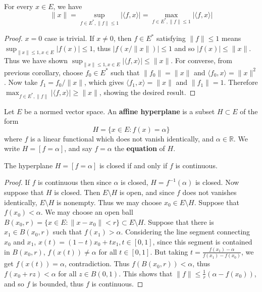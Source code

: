 \begin{cor} For every $x\in E$, we have
\begin{equation}
\|x\|=\sup_{f\in E^*,\|f\|\leq 1}|\langle f,x\rangle|=\max_{f\in E^*,\|f\|\leq 1}|\langle f,x\rangle|
\end{equation}
\end{cor}
\begin{proof}
$x=0$ case is trivial. If $x\neq 0$, then $f\in E^*$ satisfying $\|f\|\leq 1$ means $\sup_{\|x\|\leq 1,x\in E}|f(x)|\leq 1$, thus $|f(x/\|x\|)|\leq 1$ and so $|f(x)|\leq \|x\|$. Thus we have shown $\sup_{\|x\|\leq 1,x\in E}|\langle f,x\rangle|\leq \|x\|$. For converse, from previous corollary, choose $f_0\in E^*$ such that $\|f_0\|=\|x\|$ and $\langle f_0,x\rangle=\|x\|^2$. Now take $f_1=f_0/\|x\|$, which gives $\langle f_1,x\rangle = \|x\|$ and $\| f_1\|=1$. Therefore $\max_{f\in E^*, \|f\|}|\langle f,x\rangle|\geq \|x\|$, showing the desired result.
\end{proof}

\begin{defn} Let $E$ be a normed vector space. An \textbf{affine hyperplane} is a subset $H\subset E$ of the form
\begin{equation}
H=\{x\in E:f(x)=\alpha\}
\end{equation}
where $f$ is a linear functional which does not vanish identically, and $\alpha\in \mathbb{R}$. We write $H=[f=\alpha]$, and say $f=\alpha$ the \textbf{equation} of $H$.
\end{defn}

\begin{prop} The hyperplane $H=[f=\alpha]$ is closed if and only if $f$ is continuous.
\end{prop}
\begin{proof}
If $f$ is continuous then since $\alpha$ is closed, $H=f^{-1}(\alpha)$ is closed. Now suppose that $H$ is closed. Then $E\setminus H$ is open, and since $f$ does not vanishes identically, $E\setminus H$ is nonempty. Thus we may choose $x_0\in E\setminus H$. Suppose that $f(x_0)<\alpha$. We may choose an open ball $B(x_0,r)=\{x\in E:\|x-x_0\|<r\}\subset E\setminus H$. Suppose that there is $x_1\in B(x_0,r)$ such that $f(x_1)>\alpha$. Considering the line segment connecting $x_0$ and $x_1$, $x(t)=(1-t)x_0+tx_1, t\in [0,1]$, since this segment is contained in $B(x_0,r)$, $f(x(t))\neq \alpha$ for all $t\in [0,1]$. But taking $t=\frac{f(x_1)-\alpha}{f(x_1)-f(x_0)}$, we get $f(x(t))=\alpha$, contradiction. Thus $f(B(x_0,r))<\alpha$, thus $f(x_0+rz)<\alpha$ for all $z\in B(0,1)$. This shows that $\|f\|\leq \frac{1}{r}(\alpha-f(x_0))$, and so $f$ is bounded, thus $f$ is continuous. 
\end{proof}

